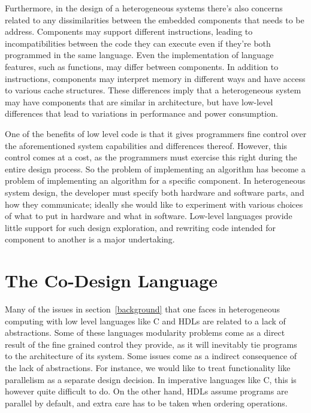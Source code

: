 Furthermore, in the design of a heterogeneous systems there's also concerns related to any dissimilarities between the embedded components that needs to be address. Components may support different instructions, leading to incompatibilities between the code they can execute even if they're both programmed in the same language. Even the implementation of language features, such as functions, may differ between components. In addition to instructions, components may interpret memory in different ways and have access to various cache structures. These differences imply that a heterogeneous system may have components that are similar in architecture, but have low-level differences that lead to variations in performance and power consumption.

One of the benefits of low level code is that it gives programmers fine control over the aforementioned system capabilities and differences thereof. However, this control comes at a cost, as the programmers must exercise this right during the entire design process. So the problem of implementing an algorithm has become a problem of implementing an algorithm for a specific component. In heterogeneous system design, the developer must specify both hardware and software parts, and how they communicate; ideally she would like to experiment with various choices of what to put in hardware and what in software. Low-level languages provide little support for such design exploration, and rewriting code intended for component to another is a major undertaking.


%
%

\section{The Co-Design Language}

Many of the issues in section~\ref{background} that one faces in heterogeneous computing with low level languages like C and HDLs are related to a lack of abstractions. Some of these languages modularity problems come as a direct result of the fine grained control they provide, as it will inevitably tie programs to the architecture of its system. Some issues come as a indirect consequence of the lack of abstractions. For instance, we would like to treat functionality like parallelism as a separate design decision. In imperative languages like C, this is however quite difficult to do. On the other hand, HDLs assume programs are parallel by default, and extra care has to be taken when ordering operations.

